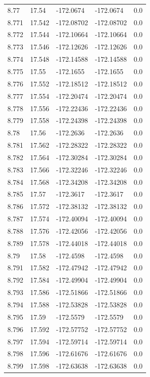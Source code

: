 \begin{tabular}{lllll}
8.77 & 17.54 & -172.0674 & -172.0674 & 0.0 \\
8.771 & 17.542 & -172.08702 & -172.08702 & 0.0 \\
8.772 & 17.544 & -172.10664 & -172.10664 & 0.0 \\
8.773 & 17.546 & -172.12626 & -172.12626 & 0.0 \\
8.774 & 17.548 & -172.14588 & -172.14588 & 0.0 \\
8.775 & 17.55 & -172.1655 & -172.1655 & 0.0 \\
8.776 & 17.552 & -172.18512 & -172.18512 & 0.0 \\
8.777 & 17.554 & -172.20474 & -172.20474 & 0.0 \\
8.778 & 17.556 & -172.22436 & -172.22436 & 0.0 \\
8.779 & 17.558 & -172.24398 & -172.24398 & 0.0 \\
8.78 & 17.56 & -172.2636 & -172.2636 & 0.0 \\
8.781 & 17.562 & -172.28322 & -172.28322 & 0.0 \\
8.782 & 17.564 & -172.30284 & -172.30284 & 0.0 \\
8.783 & 17.566 & -172.32246 & -172.32246 & 0.0 \\
8.784 & 17.568 & -172.34208 & -172.34208 & 0.0 \\
8.785 & 17.57 & -172.3617 & -172.3617 & 0.0 \\
8.786 & 17.572 & -172.38132 & -172.38132 & 0.0 \\
8.787 & 17.574 & -172.40094 & -172.40094 & 0.0 \\
8.788 & 17.576 & -172.42056 & -172.42056 & 0.0 \\
8.789 & 17.578 & -172.44018 & -172.44018 & 0.0 \\
8.79 & 17.58 & -172.4598 & -172.4598 & 0.0 \\
8.791 & 17.582 & -172.47942 & -172.47942 & 0.0 \\
8.792 & 17.584 & -172.49904 & -172.49904 & 0.0 \\
8.793 & 17.586 & -172.51866 & -172.51866 & 0.0 \\
8.794 & 17.588 & -172.53828 & -172.53828 & 0.0 \\
8.795 & 17.59 & -172.5579 & -172.5579 & 0.0 \\
8.796 & 17.592 & -172.57752 & -172.57752 & 0.0 \\
8.797 & 17.594 & -172.59714 & -172.59714 & 0.0 \\
8.798 & 17.596 & -172.61676 & -172.61676 & 0.0 \\
8.799 & 17.598 & -172.63638 & -172.63638 & 0.0 \\

\end{tabular}

